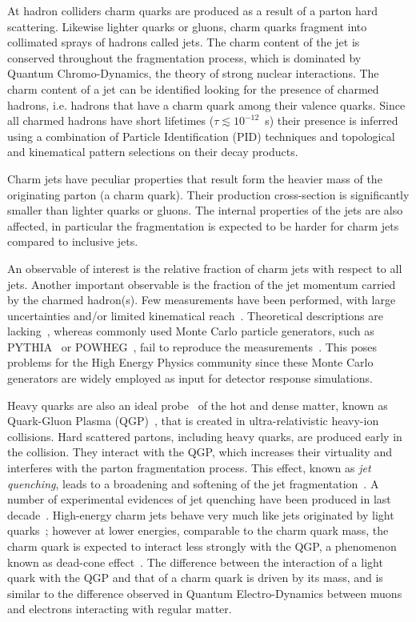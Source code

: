 \documentclass[12pt, a4paper, twoside, titlepage]{article}
\begin{document}
At hadron colliders charm quarks are produced as a result of a parton hard scattering. Likewise lighter quarks or gluons, charm quarks
fragment into collimated sprays of hadrons called jets. The charm content of the jet is conserved throughout the fragmentation process,
which is dominated by Quantum Chromo-Dynamics, the theory of strong nuclear interactions.
The charm content of a jet can be identified looking for the presence of charmed hadrons, i.e. hadrons that have
a charm quark among their valence quarks. Since all charmed hadrons have short lifetimes ($\tau \lesssim 10^{-12}$~s) their presence is inferred
using a combination of Particle Identification (PID) techniques and topological and kinematical pattern selections on their decay products.

Charm jets have peculiar properties that result form the heavier mass of the originating parton (a charm quark).
Their production cross-section is significantly smaller than lighter quarks or gluons. The internal
properties of the jets are also affected, in particular the fragmentation is expected to be harder for charm jets compared to inclusive jets.

An observable of interest is the relative fraction of charm jets with respect to all jets. Another important observable is the fraction of the jet momentum carried by
the charmed hadron(s). Few measurements have been performed, 
with large uncertainties and/or limited kinematical reach~\cite{}. Theoretical descriptions are lacking~\cite{}, whereas commonly used Monte Carlo particle
generators, such as PYTHIA~\cite{Sjostrand:2006} or POWHEG~\cite{}, fail to reproduce the measurements~\cite{}. 
This poses problems for the High Energy Physics community since these Monte Carlo generators are widely employed as input for detector response simulations.

Heavy quarks are also an ideal probe~\cite{} of the hot and dense matter, known as Quark-Gluon Plasma (QGP)~\cite{}, that is created in ultra-relativistic heavy-ion collisions. 
Hard scattered partons, including heavy quarks, are produced early in the collision. They interact with the QGP, which increases their virtuality and interferes with the
parton fragmentation process. This effect, known as \emph{jet quenching}, leads to a broadening and softening of the jet fragmentation~\cite{}. A number of
experimental evidences of jet quenching have been produced in last decade~\cite{}.
High-energy charm jets behave very much like jets originated by light quarks~\cite{}; however at lower energies, comparable to the charm quark mass, the charm quark is expected
to interact less strongly with the QGP, a phenomenon known as dead-cone effect~\cite{}. The difference between the interaction of a light quark with the QGP and that of
a charm quark is driven by its mass, and is similar to the difference observed in Quantum Electro-Dynamics between muons and electrons interacting with regular matter.
\end{document}
